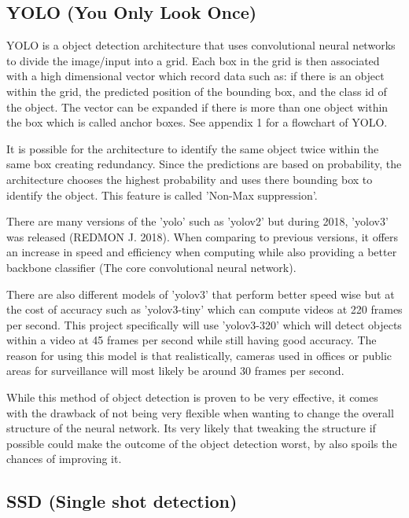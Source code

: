 \documentclass[12pt]{report}
\begin{document}
\subsection{YOLO (You Only Look Once)}

YOLO is a object detection architecture that uses convolutional neural networks to divide the image/input into a grid. Each box in the grid is then associated with a high dimensional vector which record data such as: if there is an object within the grid, the predicted position of the bounding box, and the class id of the object. The vector can be expanded if there is more than one object within the box which is called anchor boxes. See appendix 1 for a flowchart of YOLO.

It is possible for the architecture to identify the same object twice within the same box creating redundancy. Since the predictions are based on probability, the architecture chooses the highest probability and uses there bounding box to identify the object. This feature is called 'Non-Max suppression'.

There are many versions of the 'yolo' such as 'yolov2' but during 2018, 'yolov3' was released (REDMON J. 2018). When comparing to previous versions, it offers an increase in speed and efficiency when computing while also providing a better backbone classifier (The core convolutional neural network). 

There are also different models of 'yolov3' that perform better speed wise but at the cost of accuracy such as 'yolov3-tiny' which can compute videos at 220 frames per second. This project specifically will use 'yolov3-320' which will detect objects within a video at 45 frames per second while still having good accuracy. The reason for using this model is that realistically, cameras used in offices or public areas for surveillance will most likely be around 30 frames per second.

While this method of object detection is proven to be very effective, it comes with the drawback of not being very flexible when wanting to change the overall structure of the neural network. Its very likely that tweaking the structure if possible could make the outcome of the object detection worst, by also spoils the chances of improving it.

\subsection{SSD (Single shot detection)}
\end{document}
